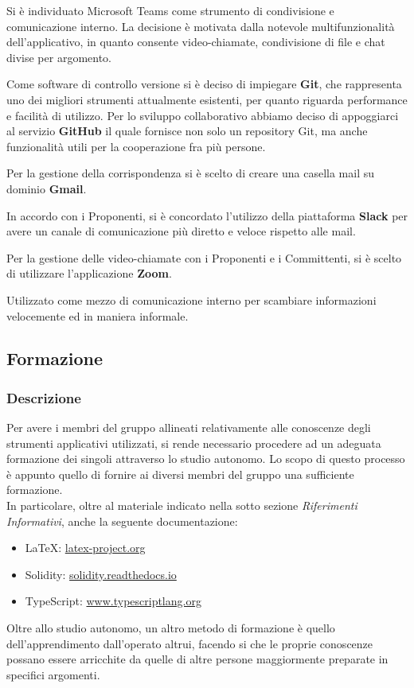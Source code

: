 				Si è individuato Microsoft Teams come strumento di condivisione e comunicazione interno. La decisione è motivata dalla notevole multifunzionalità dell'applicativo, in quanto consente video-chiamate, condivisione di file e chat divise per argomento.
				
				Come software di controllo versione si è deciso di impiegare \textbf{Git}, che rappresenta uno dei migliori strumenti attualmente esistenti, per quanto riguarda performance e facilità di utilizzo. Per lo sviluppo collaborativo abbiamo deciso di appoggiarci al servizio \textbf{GitHub} il quale fornisce non solo un repository Git, ma anche funzionalità utili per la cooperazione fra più persone.
							
				Per la gestione della corrispondenza si è scelto di creare una casella mail su dominio \textbf{Gmail}.
				
				In accordo con i Proponenti, si è concordato l'utilizzo della piattaforma \textbf{Slack} per avere un canale di comunicazione più diretto e veloce rispetto alle mail.
			
				Per la gestione delle video-chiamate con i Proponenti e i Committenti, si è scelto di utilizzare l'applicazione \textbf{Zoom}.
				
				Utilizzato come mezzo di comunicazione interno per scambiare informazioni velocemente ed in maniera informale.
				

	\subsection{Formazione}
		
		\subsubsection{Descrizione}	
		Per avere i membri del gruppo \Gruppo{} allineati relativamente alle conoscenze degli strumenti applicativi utilizzati, si rende necessario procedere ad un adeguata formazione dei singoli attraverso lo studio autonomo. Lo scopo di questo processo è appunto quello di fornire ai diversi membri del gruppo una sufficiente formazione.\\
		In particolare, oltre al materiale indicato nella sotto sezione \textit{Riferimenti Informativi}, anche la seguente documentazione:
		\begin{itemize}
			\item \LaTeX{}: \href{latex-project.org}{latex-project.org}
			\item Solidity: \href{solidity.readthedocs.io}{solidity.readthedocs.io}
			\item TypeScript: \href{www.typescriptlang.org}{www.typescriptlang.org}
		\end{itemize}
		Oltre allo studio autonomo, un altro metodo di formazione è quello dell'apprendimento dall'operato altrui, facendo si che le proprie conoscenze possano essere arricchite da quelle di altre persone maggiormente preparate in specifici argomenti.
